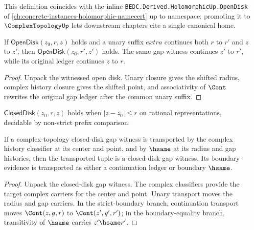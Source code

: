 \begin{remark}
This definition coincides with the inline \texttt{BEDC.Derived.HolomorphicUp.OpenDisk} of \autoref{ch:concrete-instances-holomorphic-namecert} up to namespace; promoting it to \(\ComplexTopologyUp\) lets downstream chapters cite a single canonical home.
\end{remark}

\begin{theorem}
\label{thm:cplx-topo-open-disk-point-radius-suffix}
If \(\mathsf{OpenDisk}(z_0,r,z)\) holds and a unary suffix \(extra\) continues
both \(r\) to \(r'\) and \(z\) to \(z'\), then
\(\mathsf{OpenDisk}(z_0,r',z')\) holds. The same gap witness continues \(z'\)
to \(r'\), while its original ledger continues \(z\) to \(r\).
\end{theorem}
\begin{proof}
Unpack the witnessed open disk. Unary closure gives the shifted radius, complex
history closure gives the shifted point, and associativity of \(\Cont\) rewrites
the original gap ledger after the common unary suffix.
\end{proof}

\begin{definition}
\label{def:cplx-topo-closed-disk}
\(\mathsf{ClosedDisk}(z_0, r, z)\) holds when \(|z - z_0| \leq r\) on rational representations, decidable by non-strict prefix comparison.
\end{definition}

\begin{lemma}
\label{lem:cplx-topo-closed-disk-gap-hsame-transport}
If a complex-topology closed-disk gap witness is transported by the complex
history classifier at its center and point, and by $\hsame$ at its radius and
gap histories, then the transported tuple is a closed-disk gap witness. Its
boundary evidence is transported as either a continuation ledger or boundary
$\hsame$.
\end{lemma}
\begin{proof}
Unpack the closed-disk gap witness. The complex classifiers provide the target
complex carriers for the center and point. Unary transport moves the radius and
gap carriers. In the strict-boundary branch, continuation transport moves
$\Cont(z,g,r)$ to $\Cont(z',g',r')$; in the boundary-equality branch,
transitivity of $\hsame$ carries $z'\hsame r'$.
\end{proof}

